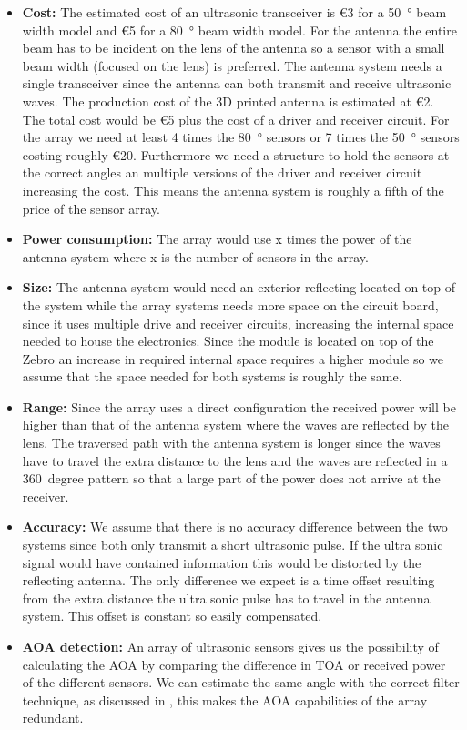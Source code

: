 \begin{itemize}
    \item
      \textbf{Cost:} The estimated cost of an ultrasonic transceiver is \euro{3} for a \SI{50}{\degree} beam width model and \euro{5} for a \SI{80}{\degree} beam width model.
      For the antenna the entire beam has to be incident on the lens of the antenna so a sensor with a small beam width (focused on the lens) is preferred.
      The antenna system needs a single transceiver since the antenna can both transmit and receive ultrasonic waves.
      The production cost of the 3D printed antenna is estimated at \euro{2}.
      The total cost would be \euro{5} plus the cost of a driver and receiver circuit.
      For the array we need at least 4 times the \SI{80}{\degree} sensors or 7 times the \SI{50}{\degree} sensors costing roughly \euro{20}.
      Furthermore we need a structure to hold the sensors at the correct angles an multiple versions of the driver and receiver circuit increasing the cost. This means the antenna system is roughly a fifth of the price of the sensor array.
    \item
      \textbf{Power consumption:} The array would use x times the power of the antenna system where x is the number of sensors in the array.
    \item
      \textbf{Size:} The antenna system would need an exterior reflecting located on top of the system while the array systems needs more space on the circuit board, since it uses multiple drive and receiver circuits, increasing the internal space needed to house the electronics.
      Since the module is located on top of the Zebro an increase in required internal space requires a higher module so we assume that the space needed for both systems is roughly the same.
    \item
      \textbf{Range:} Since the array uses a direct configuration the received power will be higher than that of the antenna system where the waves are reflected by the lens.
      The traversed path with the antenna system is longer since the waves have to travel the extra distance to the lens and the waves are reflected in a \SI{360}{degree} pattern so that a large part of the power does not arrive at the receiver.
    \item
      \textbf{Accuracy:} We assume that there is no accuracy difference between the two systems since both only transmit a short ultrasonic pulse.
      If the ultra sonic signal would have contained information this would be distorted by the reflecting antenna.
      The only difference we expect is a time offset resulting from the extra distance the ultra sonic pulse has to travel in the antenna system. This offset is constant so easily compensated.
    \item
      \textbf{AOA detection:} An array of ultrasonic sensors gives us the possibility of calculating the AOA by comparing the difference in TOA or received power of the different sensors.
      We can estimate the same angle with the correct filter technique, as discussed in \cite{processing}, this makes the AOA capabilities of the array redundant.
\end{itemize}

